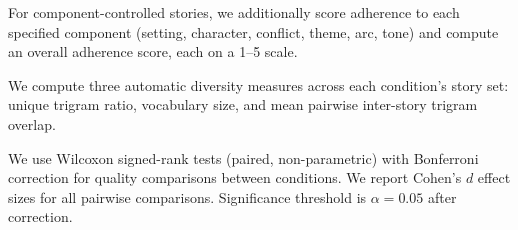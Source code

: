 For component-controlled stories, we additionally score adherence to each specified component (setting, character, conflict, theme, arc, tone) and compute an overall adherence score, each on a 1--5 scale.

We compute three automatic diversity measures across each condition's story set: unique trigram ratio, vocabulary size, and mean pairwise inter-story trigram overlap.

We use Wilcoxon signed-rank tests (paired, non-parametric) with Bonferroni correction for quality comparisons between conditions. We report Cohen's $d$ effect sizes for all pairwise comparisons. Significance threshold is $\alpha = 0.05$ after correction.
